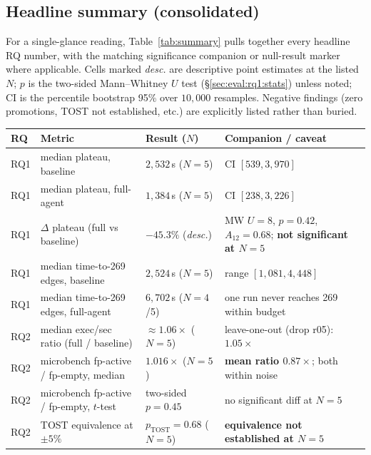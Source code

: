 \documentclass[11pt]{article}
\begin{document}
\subsection{Headline summary (consolidated)}
\label{sec:eval:summary}

For a single-glance reading, Table~\ref{tab:summary} pulls
together every headline RQ number, with the matching significance
companion or null-result marker where applicable. Cells marked
\emph{desc.} are descriptive point estimates at the listed $N$;
$p$ is the two-sided Mann--Whitney $U$ test (\S\ref{sec:eval:rq1:stats})
unless noted; CI is the percentile bootstrap 95\% over $10{,}000$
resamples. Negative findings (zero promotions, TOST not
established, etc.) are explicitly listed rather than buried.

\begin{table}[H]
  \centering
  \footnotesize
  \setlength{\tabcolsep}{4pt}
  \renewcommand{\arraystretch}{1.15}
  \begin{tabularx}{\linewidth}{@{}l Z Z Z@{}}
    \toprule
    RQ & Metric & Result ($N$) & Companion / caveat \\
    \midrule
    RQ1 & median plateau, baseline       & $2{,}532$\,s ($N{=}5$)   & CI $[539, 3{,}970]$ \\
    RQ1 & median plateau, full-agent     & $1{,}384$\,s ($N{=}5$)   & CI $[238, 3{,}226]$ \\
    RQ1 & $\Delta$ plateau (full vs baseline) & $-45.3\%$ (\emph{desc.}) & MW $U{=}8$, $p{=}0.42$, $A_{12}{=}0.68$; \textbf{not significant at $N{=}5$} \\
    RQ1 & median time-to-269 edges, baseline & $2{,}524$\,s ($N{=}5$) & range $[1{,}081, 4{,}448]$ \\
    RQ1 & median time-to-269 edges, full-agent & $6{,}702$\,s ($N{=}4$/5) & one run never reaches 269 within budget \\
    RQ2 & median exec/sec ratio (full / baseline) & $\approx 1.06\times$ ($N{=}5$) & leave-one-out (drop r05): $1.05\times$ \\
    RQ2 & microbench fp-active / fp-empty, median & $1.016\times$ ($N{=}5$) & \textbf{mean ratio $0.87\times$}; both within noise \\
    RQ2 & microbench fp-active / fp-empty, $t$-test & two-sided $p{=}0.45$ & no significant diff at $N{=}5$ \\
    RQ2 & TOST equivalence at $\pm5\%$ & $p_{\text{TOST}}{=}0.68$ ($N{=}5$) & \textbf{equivalence not established at $N{=}5$} \\

\end{tabularx}
\end{table}
\end{document}
